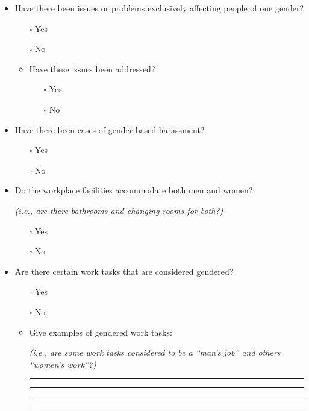 \documentclass[
  12pt,
]{scrbook}
\providecommand{\tightlist}{%
  \setlength{\itemsep}{0pt}\setlength{\parskip}{0pt}}
\begin{document}
\begin{itemize}
\item
  Have there been issues or problems exclusively affecting people of one gender?

  \begin{itemize}
  \item[$\square$]
    Yes
  \item[$\square$]
    No
  \item
    Have these issues been addressed?

    \begin{itemize}
    \tightlist
    \item[$\square$]
      Yes
    \item[$\square$]
      No
    \end{itemize}
  \end{itemize}
\item
  Have there been cases of gender-based harassment?

  \begin{itemize}
  \tightlist
  \item[$\square$]
    Yes
  \item[$\square$]
    No
  \end{itemize}
\item
  Do the workplace facilities accommodate both men and women?

  \emph{(i.e., are there bathrooms and changing rooms for both?)}

  \begin{itemize}
  \tightlist
  \item[$\square$]
    Yes
  \item[$\square$]
    No
  \end{itemize}
\item
  Are there certain work tasks that are considered gendered?

  \begin{itemize}
  \item[$\square$]
    Yes
  \item[$\square$]
    No
  \item
    Give examples of gendered work tasks:

    \emph{(i.e., are some work tasks considered to be a ``man's job'' and others ``women's work''?)}

    \begin{center}\rule{0.5\linewidth}{0.5pt}\end{center}

    \begin{center}\rule{0.5\linewidth}{0.5pt}\end{center}

    \begin{center}\rule{0.5\linewidth}{0.5pt}\end{center}

    \begin{center}\rule{0.5\linewidth}{0.5pt}\end{center}
  \end{itemize}
\end{itemize}
\end{document}
